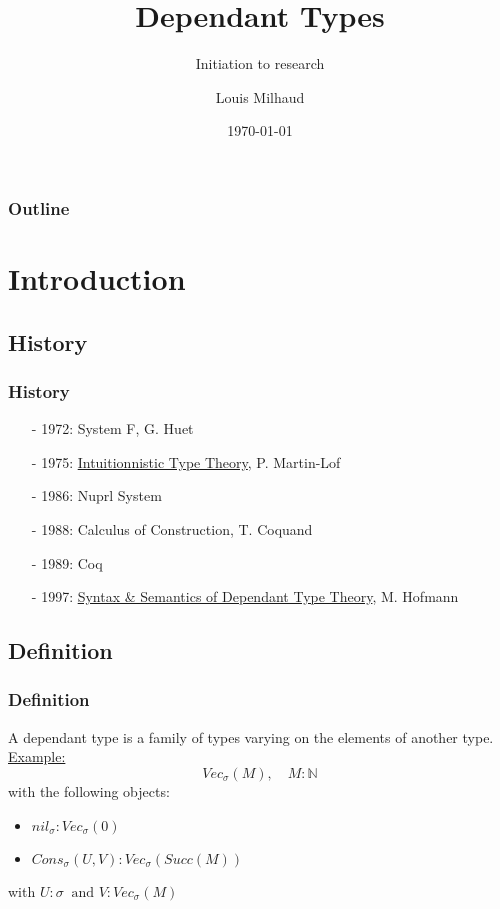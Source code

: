 \documentclass{beamer}
\title{Dependant Types}
\subtitle{Initiation to research}
\author{Louis Milhaud}
\institute{Université Paris Saclay}
\date{\today}
\newcommand{\N}{\mathbb{N}}
\begin{document}
    \begin{frame}
        \titlepage
    \end{frame}
    \begin{frame}
        \frametitle{Outline}
        \tableofcontents
    \end{frame}
    \section{Introduction}
    \subsection{History}
    \begin{frame}
        \frametitle{History}
        \begin{itemize}
            \item[-] 1972: System F, G. Huet
            \item[-] 1975: \underline{Intuitionnistic Type Theory}, P. Martin-Lof
            \item[-] 1986: Nuprl System
            \item[-] 1988: Calculus of Construction, T. Coquand  
            \item[-] 1989: Coq
            \item[-] 1997: \underline{Syntax \& Semantics of Dependant Type Theory}, M. Hofmann 
        \end{itemize}
    \end{frame}
    \subsection{Definition}
    \begin{frame}
        \frametitle{Definition}
        A dependant type is a family of types varying on the elements of another type.\\
        \vspace{20pt}
        \underline{Example:}\\
        $$Vec_\sigma(M),\quad M:\N $$
        with the following objects:
        \begin{itemize}
            \item $nil_\sigma : Vec_\sigma(0)$
            \item $Cons_\sigma(U, V) : Vec_\sigma(Succ(M))$ 
        \end{itemize}
        with $ U : \sigma\ \text{ and } V : Vec_\sigma(M)$
    \end{frame}
\end{document}
